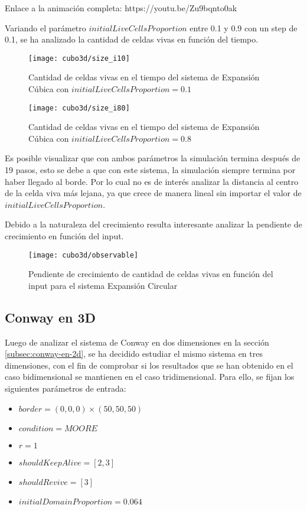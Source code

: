 Enlace a la animación completa: https://youtu.be/Zu9bqnto0ak


Variando el parámetro $initialLiveCellsProportion$ entre 0.1 y 0.9 con un step de 0.1, se ha analizado la cantidad de celdas vivas en función
del tiempo.

\begin{figure}[H]
    \centering
    \texttt{[image: cubo3d/size\_i10]}
    \caption{Cantidad de celdas vivas en el tiempo del sistema de Expansión Cúbica con $initialLiveCellsProportion = 0.1$}
    \label{fig:cubo3d_i10}
\end{figure}
\begin{figure}[H]
    \centering
    \texttt{[image: cubo3d/size\_i80]}
    \caption{Cantidad de celdas vivas en el tiempo del sistema de Expansión Cúbica con $initialLiveCellsProportion = 0.8$}
    \label{fig:cubo3d_i80}
\end{figure}


Es posible visualizar que con ambos parámetros la simulación termina después de 19 pasos, esto se debe a que con este sistema, la simulación
siempre termina por haber llegado al borde. Por lo cual no es de interés analizar la distancia al centro de la celda viva más lejana, ya que
crece de manera lineal sin importar el valor de $initialLiveCellsProportion$.

Debido a la naturaleza del crecimiento resulta interesante analizar la pendiente de crecimiento en función del input.


\begin{figure}[H]
    \centering
    \texttt{[image: cubo3d/observable]}
    \caption{Pendiente de crecimiento de cantidad de celdas vivas en función del input para el sistema Expansión Circular}
    \label{fig:cubo3d_observable}
\end{figure}


\subsection{Conway en 3D}\label{subsec:conway-en-3d}

Luego de analizar el sistema de Conway en dos dimensiones en la sección \ref{subsec:conway-en-2d},
se ha decidido estudiar el mismo sistema en tres dimensiones, con el fin de comprobar si los resultados
que se han obtenido en el caso bidimensional se mantienen en el caso tridimensional.
Para ello, se fijan los siguientes parámetros de entrada:
\begin{itemize}
    \item $border = (0, 0, 0) \times (50, 50, 50)$
    \item $condition = MOORE$
    \item $r = 1$
    \item $shouldKeepAlive = [2, 3]$
    \item $shouldRevive = [3]$
    \item $initialDomainProportion = 0.064$
\end{itemize}

